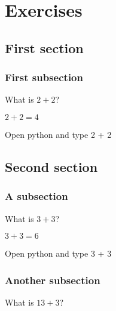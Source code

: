 \documentclass{book}
\begin{document}
\chapter{Exercises}

\section{First section}

\subsection{First subsection}

\begin{exercise}[subtitle={Simple Addition}]
  What is \(2 + 2\)?
\end{exercise}

\begin{solution}
  \(2 + 2 = 4\)
\end{solution}

\begin{additionalinformation}
Open python and type 2 + 2
\end{additionalinformation}

\section{Second section}

\subsection{A subsection}

\begin{exercise}[examdate={January 15, 2020}, examproblemnumber={1}, examproblemid={2020_01_15_01}]
  What is \(3 + 3\)?
\end{exercise}

\begin{solution}
  \(3 + 3 = 6\)
\end{solution}

\begin{additionalinformation}
Open python and type 3 + 3
\end{additionalinformation}

\subsection{Another subsection}

\begin{exercise}
  What is \(13 + 3\)?
\end{exercise}
\end{document}
